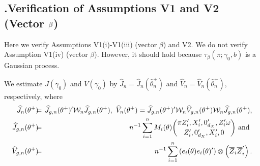 \documentclass[12pt,thmsb,titlepage,final,oneside,letterpaper]{article}
\begin{document}
\subsection{\hspace{-0.23in}\textbf{.}\hspace{0.18in}Verification of
Assumptions V1 and V2 (Vector $\mathbf{\protect\beta }$)}

\hspace{0.25in}Here we verify Assumptions V1(i)-V1(iii) (vector $\beta $)
and V2. We do not verify Assumption V1(iv) (vector $\beta $). However, it
should hold because $\tau _{\beta }(\pi ;\gamma _{0},b)$ is a Gaussian
process.

We estimate $J(\gamma _{0})$ and $V(\gamma _{0})$ by $\widehat{J}_{n}=%
\widehat{J}_{n}(\widehat{\theta }_{n}^{+})$ and $\widehat{V}_{n}=\widehat{V}%
_{n}(\widehat{\theta }_{n}^{+}),$ respectively, where%
\begin{eqnarray}
\widehat{J}_{n}(\theta ^{+})\hspace{-0.08in} &=&\hspace{-0.08in}\widehat{J}%
_{g,n}(\theta ^{+})^{\prime }\mathcal{W}_{n}\widehat{J}_{g,n}(\theta ^{+}),%
\text{ }\widehat{V}_{n}(\theta ^{+})=\widehat{J}_{g,n}(\theta ^{+})^{\prime }%
\mathcal{W}_{n}\widehat{V}_{g,n}(\theta ^{+})\mathcal{W}_{n}\widehat{J}%
_{g,n}(\theta ^{+}),  \notag \\
\widehat{J}_{g,n}(\theta ^{+})\hspace{-0.08in} &=&\hspace{-0.08in}%
n^{-1}\sum_{i=1}^{n}M_{i}(\theta )\binom{\pi Z_{i}^{\prime },X_{i}^{\prime
},0_{d_{X}}^{\prime },Z_{i}^{\prime }\omega }{Z_{i}^{\prime
},0_{d_{X}}^{\prime },X_{i}^{\prime },0}\text{ and }  \notag \\
\widehat{V}_{g,n}(\theta ^{+})\hspace{-0.08in} &=&\hspace{-0.08in}%
n^{-1}\sum_{i=1}^{n}\left( e_{i}(\theta )e_{i}(\theta )^{\prime }\right)
\otimes \left( \overline{Z}_{i}\overline{Z}_{i}^{\prime }\right) .
\end{eqnarray}
\end{document}
